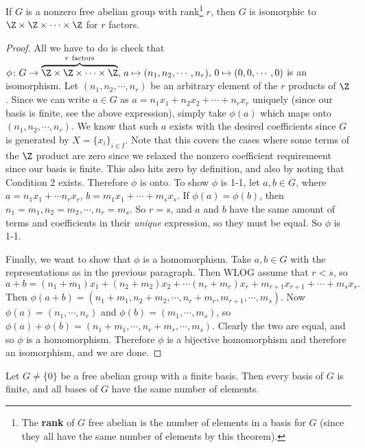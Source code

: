 \begin{theorem}\label{zzz}
    If $G$ is a nonzero free abelian group with rank\footnote{The \textbf{rank} of $G$ free abelian is the number of elements in a basis for $G$ (since they all have the same number of elements by this theorem).} $r$, then $G$ is isomorphic to $\Z\times \Z\times \cdots \times \Z$ for $r$ factors.
\end{theorem}
\begin{proof}
    All we have to do is check that $\phi \colon G \to \overset{r \ \text{factors} }{\overbrace{\Z\times \Z\times \cdots \times \Z}} ,\, a\mapsto  (n_1,n_2,\cdots ,n_r),\, 0\mapsto (0,0,\cdots ,0)$ is an isomorphism. Let $(n_1,n_2,\cdots ,n_r)$ be an arbitrary element of the $r$ products of $\Z$. Since we can write $a\in G$ as $a=n_1x_1+n_2x_2+\cdots +n_rx_r$ uniquely (since our basis is finite, see the above expression), simply take $\phi (a)$ which maps onto $(n_1,n_2,\cdots ,n_r)$. We know that such $a$ exists with the desired coefficients since $G$ is generated by $X=\{x_i \} _{i\in I}$. Note that this covers the cases where some terms of the $\Z$ product are zero since we relaxed the nonzero coefficient requiremeent since our basis is finite. This also hits zero by definition, and also by noting that Condition 2 exists. Therefore $\phi$ is onto. 
    To show $\phi$ is 1-1, let $a,b\in G$, where $a=n_1x_1+\cdots n_rx_r       $, $b=m_1x_1+\cdots +m_sx_s$. If $\phi(a)=\phi(b)$, then $n_1=m_1,n_2=m_2,\cdots ,n_r=m_s$. So $r=s$, and $a$ and $b$ have the same amount of terms and coefficients in their \emph{unique} expression, so they must be equal. So $\phi$ is 1-1.

    Finally, we want to show that $\phi$ is a homomorphism. Take $a,b\in G$ with the representations as in the previous paragraph. Then WLOG assume that $r<s$, so $a+b=(n_1+m_1)x_1+(n_2+m_2)x_2+\cdots (n_r+m_r)x_r+m_{r+1}x_{r+1}+\cdots +m_sx_s.$ Then $\phi(a+b)=\left( n_1+m_1,n_2+m_2,\cdots ,n_r+m_r,m_{r+1},\cdots ,m_s \right) $. Now $\phi(a)=(n_1,\cdots ,n_r)$ and $\phi(b)=(m_1,\cdots ,m_s)$, so $\phi(a)+\phi(b)=(n_1+m_1,\cdots ,n_r+m_r,\cdots ,m_s)$. Clearly the two are equal, and so $\phi$ is a homomorphism. Therefore $\phi$ is a bijective homomorphism and therefore an isomorphism, and we are done.
\end{proof}     
\begin{theorem}
    Let $G\neq \{0\} $ be a free abelian group with a finite basis. Then every basis of $G$ is finite, and all bases of $G$ have the same number of elements.
\end{theorem}
